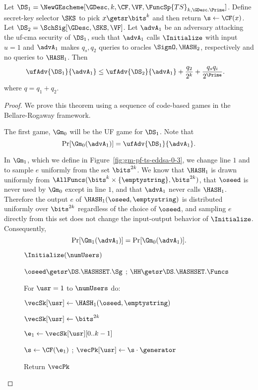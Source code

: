 \begin{theorem}\label{th-ts-eddsa} Let $\DS_1 = \NewGEscheme[\GDesc,k,\CF,\VF,\FuncSp{TS}_{k,\GDesc.\Prime}]$. Define secret-key selector $\SKS$ to pick $x\getsr\bits^k$ and then return $\s\gets\CF(x)$. Let $\DS_2 = \SchSig[\GDesc,\SKS,\VF]$. Let $\advA_1$ be an adversary attacking the uf-cma security of $\DS_1$, such that $\advA_1$ calls $\Initialize$ with input $u = 1$ and $\advA_1$ makes $q_s, q_2$ queries to oracles $\SignO,\HASH_2$, respectively and no queries to $\HASH_1$. Then 
	\begin{align}
	\ufAdv{\DS_1}{\advA_1} &\leq \ufAdv{\DS_2}{\advA_1} + \frac{q_2}{2^{k}}+\frac{q_sq_i}{2^{\Prime}}.
	\end{align}
	where $q=q_1+q_2$.
\end{theorem}
\begin{proof}
	
	We prove this theorem using a sequence of code-based games in the Bellare-Rogaway framework.
	
	The first game, $\Gm_0$ will be the UF game for $\DS_1$. Note that 
		\[\Pr[\Gm_0(\advA_1)] = \ufAdv{\DS_1}{\advA_1}.\]
		
	In $\Gm_1$, which we define in Figure~\ref{fig:gm-pf-ts-eddsa-0-3}, we change line $1$ and to sample $e$ uniformly from the set $\bits^{2k}$. We know that $\HASH_1$ is drawn uniformly from $\AllFuncs(\bits^{k}\times \{\emptystring\}, \bits^{2k})$, that $\oseed$ is never used by $\Gm_0$ except in line $1$, and that $\advA_1$ never calls $\HASH_1$. Therefore the output $e$ of $\HASH_1(\oseed,\emptystring)$ is distributed uniformly over $\bits^{2k}$ regardless of the choice of $\oseed$, and sampling $e$ directly from this set does not change the input-output behavior of $\Initialize$. Consequently,
	\[\Pr[\Gm_1(\advA_1)] = \Pr[\Gm_0(\advA_1)].\]
	
	\begin{figure}
		{
			
			\begin{oracle}{$\Initialize(\numUsers)$}
				\item $\oseed\getsr\DS.\HASHSET.\Sg$ ;
				$\HH \getsr \DS.\HASHSET.\Funcs$
				\item For $\usr=1$ to $\numUsers$ do:
				\item \quad $\vecSk[\usr] \gets \HASH_1(\oseed,\emptystring)$ 
				\item \quad $\vecSk[\usr] \gets \bits^{2k}$ 
				\item \quad $\e_1 \gets \vecSk[\usr][0..k-1]$ 
				\item \quad $\s \gets \CF(\e_1)$ ; $\vecPk[\usr] \gets \s\cdot \generator$
				\item Return $\vecPk$
			\end{oracle}
			\ExptSepSpace
			
}
\end{figure}
\end{proof}

